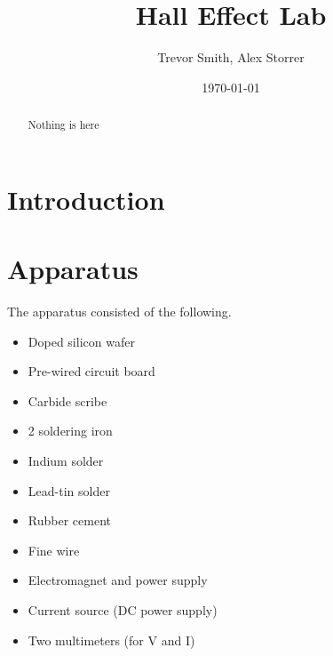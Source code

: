 \documentclass[aps,prl,reprint]{revtex4-2}
\begin{document}

\title{Hall Effect Lab}


\author{Trevor Smith, Alex Storrer}


\date{\today}

\begin{abstract}
	Nothing is here
\end{abstract}


\maketitle

\section{Introduction}

\section{Apparatus}

The apparatus consisted of the following.

\begin{itemize}
	\item Doped silicon wafer
	\item Pre-wired circuit board
	\item Carbide scribe
	\item 2 soldering iron
	\item Indium solder
	\item Lead-tin solder
	\item Rubber cement
	\item Fine wire
	\item Electromagnet and power supply
	\item Current source (DC power supply)
	\item Two multimeters (for V and I)
\end{itemize}
\end{document}
